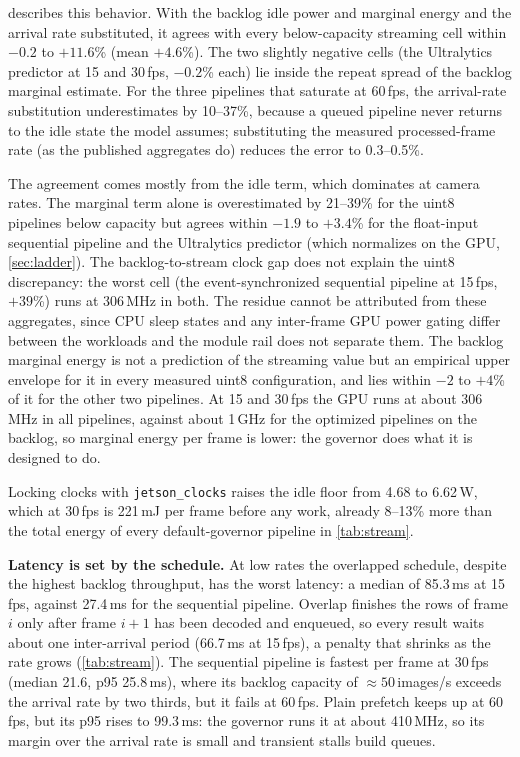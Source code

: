  describes this behavior. With the backlog idle power
and marginal energy and the arrival rate substituted, it agrees with
every below-capacity streaming cell within $-0.2$ to $+11.6$\% (mean $+4.6$\%). The two slightly negative cells (the Ultralytics predictor at 15 and
30\,fps, $-0.2$\% each) lie inside the repeat spread of the backlog marginal estimate.
For the three pipelines that saturate at 60\,fps, the arrival-rate
substitution underestimates by 10--37\%, because a queued pipeline never
returns to the idle state the model assumes; substituting the measured
processed-frame rate (as the published aggregates do) reduces the error
to 0.3--0.5\%.

The agreement comes mostly from the idle term, which
dominates at camera rates. The marginal term alone is overestimated by
21--39\% for the uint8 pipelines below capacity but agrees within
$-1.9$ to $+3.4$\% for the float-input sequential pipeline and the
Ultralytics predictor (which normalizes on the GPU, \cref{sec:ladder}). The backlog-to-stream clock gap does not explain the
uint8 discrepancy: the worst cell (the event-synchronized sequential
pipeline at 15\,fps, $+39$\%) runs at 306\,MHz in both. The residue
cannot be attributed from these aggregates, since CPU sleep states and
any inter-frame GPU power gating differ between the workloads and the
module rail does not separate them. The backlog marginal energy is not a prediction of the streaming value but an
empirical upper envelope for it in every measured uint8 configuration,
and lies within $-2$ to $+4$\% of it for the other two pipelines. At 15
and 30\,fps the GPU runs at about 306\,MHz in all pipelines, against
about 1\,GHz for the optimized pipelines on the backlog, so marginal
energy per frame is lower: the governor does what it is designed to do.

Locking clocks with \texttt{jetson\_clocks} raises the idle floor from
4.68 to 6.62\,W, which at 30\,fps is 221\,mJ per frame
before any work, already 8--13\% more than the total energy of every
default-governor pipeline in \cref{tab:stream}.

\textbf{Latency is set by the schedule.}
At low rates the overlapped schedule, despite the highest backlog
throughput, has the worst latency: a median of
85.3\,ms at 15\,fps, against 27.4\,ms for the sequential pipeline.
Overlap finishes the rows of frame $i$ only after frame $i{+}1$ has
been decoded and enqueued, so every result waits about one
inter-arrival period (66.7\,ms at 15\,fps), a penalty that shrinks as
the rate grows (\cref{tab:stream}).
The sequential pipeline is fastest per frame at 30\,fps (median 21.6,
p95 25.8\,ms), where its backlog capacity of ${\approx}50$\,images/s
exceeds the arrival rate by two thirds, but it fails at 60\,fps.
Plain prefetch keeps up at 60\,fps, but its p95 rises to 99.3\,ms: the
governor runs it at about 410\,MHz, so its margin over the arrival rate
is small and transient stalls build queues.

